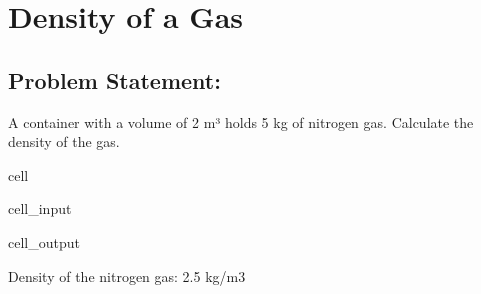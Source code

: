 \documentclass[letterpaper,10pt,english]{jupyterBook}
\begin{document}
\section{Density of a Gas}
\label{\detokenize{notebooks/Chapter2/Problem_2_Density_of_a_Gas:density-of-a-gas}}\label{\detokenize{notebooks/Chapter2/Problem_2_Density_of_a_Gas::doc}}

\subsection{Problem Statement:}
\label{\detokenize{notebooks/Chapter2/Problem_2_Density_of_a_Gas:problem-statement}}
\sphinxAtStartPar
A container with a volume of 2 m³ holds 5 kg of nitrogen gas.
Calculate the density of the gas.

\begin{sphinxuseclass}{cell}\begin{sphinxVerbatimInput}

\begin{sphinxuseclass}{cell_input}
\begin{sphinxVerbatim}[commandchars=\\\{\}]

    
    

    

\end{sphinxVerbatim}

\end{sphinxuseclass}\end{sphinxVerbatimInput}
\begin{sphinxVerbatimOutput}

\begin{sphinxuseclass}{cell_output}
\begin{sphinxVerbatim}[commandchars=\\\{\}]
Density of the nitrogen gas: 2.5 kg/m\PYGZca{}3
\end{sphinxVerbatim}

\end{sphinxuseclass}\end{sphinxVerbatimOutput}

\end{sphinxuseclass}
\sphinxstepscope
\end{document}
